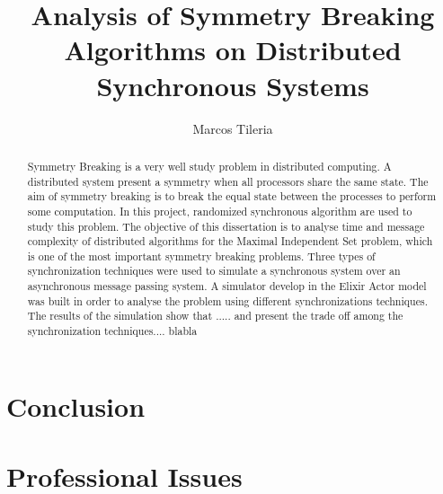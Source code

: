 \documentclass[11pt]{article} %
\title{Analysis of Symmetry Breaking Algorithms on Distributed Synchronous Systems}
\author{Marcos Tileria}
\theoremstyle{plain}
\theoremstyle{definition}
\begin{document}
\maketitle

\declaration

\begin{abstract}
  
 Symmetry Breaking is a very well study problem in distributed computing. A distributed system present a symmetry when all processors share the same state. The aim of symmetry breaking is to break the equal state between the processes to perform some computation. In this project, randomized synchronous algorithm  are used to study this problem. The objective of this dissertation is to analyse time and message complexity of distributed algorithms for the Maximal Independent Set problem, which is one of the most important symmetry breaking problems. Three types of synchronization techniques were used to simulate a synchronous system over an asynchronous message passing system. A simulator develop in the Elixir Actor model was built in order to analyse the problem using different synchronizations techniques. The results of the simulation show that ..... and present the trade off among the synchronization techniques.... blabla 
  
\end{abstract}




\newpage




\newpage


\newpage


\newpage
% 

\section{Conclusion}

\section{Professional Issues}



\end{document}

